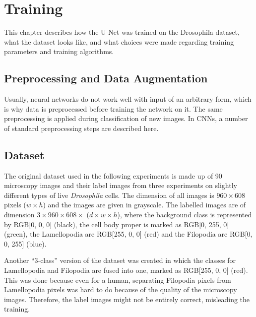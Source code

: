 	\chapter{Training}
This chapter describes how the U-Net was trained on the Drosophila dataset, what the dataset looks like, and what choices were made regarding training parameters and training algorithms.


	\section {Preprocessing and Data Augmentation}
Usually, neural networks do not work well with input of an arbitrary form, which is why data is preprocessed before training the network on it. The same preprocessing is applied during classification of new images. In CNNs, a number of standard preprocessing steps are described here.

	\section{Dataset}
The original dataset used in the following experiments is made up of 90 microscopy images and their label images from three experiments on slightly different types of live \textit{Drosophila} cells. The dimension of all images is $960 \times 608$ pixels ($w \times h$) and the images are given in grayscale. The labelled images are of dimension $3 \times 960 \times 608 \times$ ($d \times w \times h$), where the background class is represented by RGB[0, 0, 0] (black), the cell body proper is marked as RGB[0, 255, 0] (green), the Lamellopodia are RGB[255, 0, 0] (red) and the Filopodia are RGB[0, 0, 255] (blue).

Another ``3-class'' version of the dataset was created in which the classes for Lamellopodia and Filopodia are fused into one, marked as RGB[255, 0, 0] (red). This was done because even for a human, separating Filopodia pixels from Lamellopodia pixels was hard to do because of the quality of the microscopy images. Therefore, the label images might not be entirely correct, misleading the training.\\

